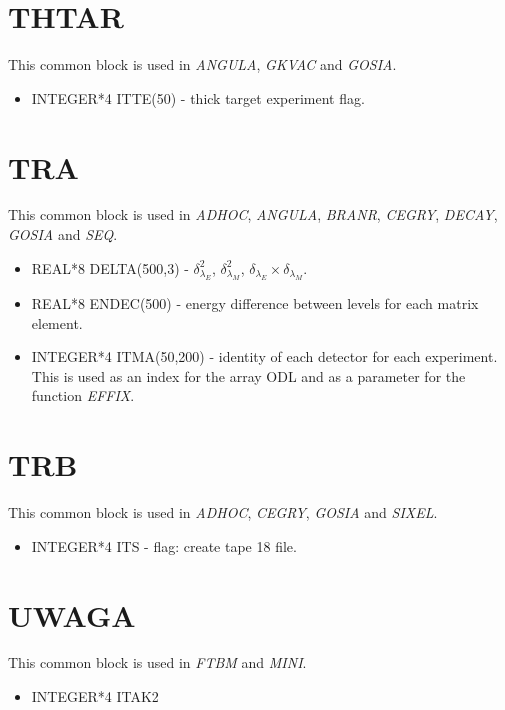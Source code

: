 \section{THTAR}

This common block is used in {\em ANGULA}, {\em GKVAC} and {\em GOSIA}.

\begin{itemize}
\item INTEGER*4 ITTE(50) - thick target experiment flag.
\end{itemize}

\section{TRA}

This common block is used in {\em ADHOC}, {\em ANGULA}, {\em BRANR}, {\em
CEGRY}, {\em DECAY}, {\em GOSIA} and {\em SEQ}.

\begin{itemize}
\item REAL*8 DELTA(500,3) - $\delta^2_{\lambda_E}$, $\delta^2_{\lambda_M}$,
$\delta_{\lambda_E}\times\delta_{\lambda_M}$.
\item REAL*8 ENDEC(500) - energy difference between levels for each matrix
element.
\item INTEGER*4 ITMA(50,200) - identity of each detector for each
experiment. This is used as an index for the array ODL and as a parameter
for the function {\em EFFIX}.
\end{itemize}

\section{TRB}

This common block is used in {\em ADHOC}, {\em CEGRY}, {\em GOSIA} and {\em
SIXEL}.

\begin{itemize}
\item INTEGER*4 ITS - flag: create tape 18 file.
\end{itemize}

\section{UWAGA}

This common block is used in {\em FTBM} and {\em MINI}.

\begin{itemize}
\item INTEGER*4 ITAK2
\end{itemize}


